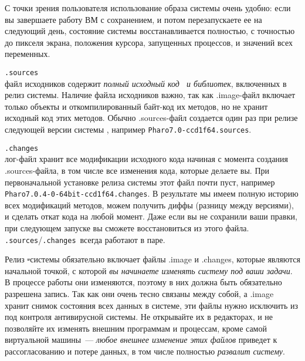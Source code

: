 \begin{description}
    С точки зрения пользователя использование образа системы очень удобно: если вы завершаете работу ВМ с сохранением, и потом перезапускаете ее
    на следующий день, состояние системы восстанавливается полностью, с точностью до пикселя экрана, положения курсора, запущенных процессов,
    и значений всех переменных.

    \item{\verb|.sources|}\\ файл исходников содержит \emph{полный исходный код \ph\ и библиотек}, включенных в релиз системы.
    Наличие файла исходников важно, так как .image-файл включает только объекты и откомпилированный байт-код их методов, но не хранит
    исходный код этих методов. Обычно .sources-файл создается один раз при релизе следующей версии системы \ph, например
    \verb|Pharo7.0-ccd1f64.sources|.

    \item{\verb|.changes|}\\ лог-файл хранит все модификации исходного кода начиная с момента создания .sources-файла, в том числе все
    изменения кода, которые делаете вы. При первоначальной установке релиза системы этот файл почти пуст, например
    \verb|Pharo7.0.4-0-64bit-ccd1f64.changes|. В результате мы имеем полную историю всех модификаций методов, можем получить диффы
    (разницу между версиями), и сделать откат кода на любой момент. Даже если вы не сохранили ваши правки, при следующем запуске вы сможете восстановиться из этого файла.\\
    \verb|.sources|/\verb|.changes|\ всегда работают в паре.

\end{description}

Релиз \st-системы обязательно включает файлы .image и .changes, которые являются начальной точкой, с которой \emph{вы начинаете изменять
систему под ваши задачи}. В процессе работы они изменяются, поэтому в них должна быть обязательно разрешена запись. Так как они очень тесно
связаны между собой, а .image хранит снимок состояния всех данных в системе,
эти файлы нужно исключить из под контроля антивирусной системы. Не открывайте их в редакторах, и не позволяйте их изменять внешним
программам и процессам, кроме самой виртуальной машины\ --- \emph{любое внешнее изменение этих файлов} приведет к рассогласованию и потере данных,
в том числе полностью \emph{развалит систему}.

